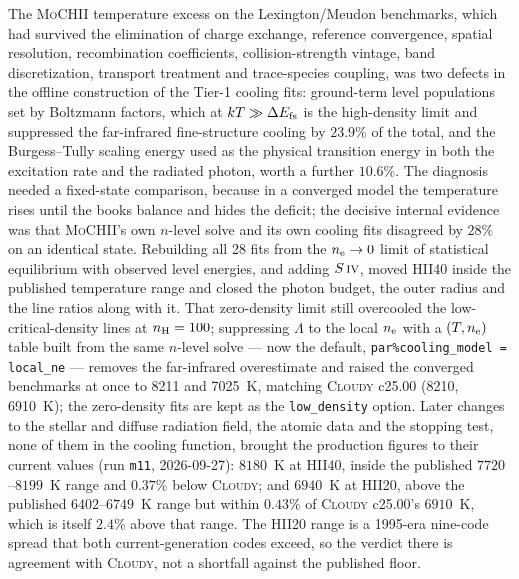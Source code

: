 \documentclass[english,a4paper]{my_memo}
\newcommand{\code}[1]{\texttt{#1}}
\newcommand{\MoCHII}{\textsc{MoCHII}}
\newcommand{\Cloudy}{\textsc{Cloudy}}
\newcommand{\SIV}{S\,\textsc{iv}}
\newcommand{\nel}{n_{\rm e}}
\newcommand{\nH}{n_{\rm H}}
\begin{document}
The \MoCHII{} temperature excess on the Lexington/Meudon benchmarks, which had
survived the elimination of charge exchange, reference convergence, spatial
resolution, recombination coefficients, collision-strength vintage, band
discretization, transport treatment and trace-species coupling, was two
defects in the offline construction of the Tier-1 cooling fits: ground-term
level populations set by Boltzmann factors, which at $kT \gg \Delta E_{\rm fs}$
is the high-density limit and suppressed the far-infrared fine-structure
cooling by $23.9\%$ of the total, and the Burgess--Tully scaling energy used
as the physical transition energy in both the excitation rate and the radiated
photon, worth a further $10.6\%$.  The diagnosis needed a fixed-state
comparison, because in a converged model the temperature rises until the books
balance and hides the deficit; the decisive internal evidence was that
\MoCHII{}'s own $n$-level solve and its own cooling fits disagreed by $28\%$
on an identical state.  Rebuilding all 28 fits from the $\nel \to 0$ limit of
statistical equilibrium with observed level energies, and adding $\SIV{}$,
moved HII40 inside the published temperature range and closed the photon
budget, the outer radius and the line ratios along with it.  That zero-density
limit still overcooled the low-critical-density lines at $\nH = 100$;
suppressing $\Lambda$ to the local $\nel$ with a $(T, \nel)$ table built from
the same $n$-level solve --- now the default,
\code{par\%cooling\_model = local\_ne} --- removes the far-infrared overestimate
and raised the converged benchmarks at once to 8211 and 7025~K, matching
\Cloudy{} c25.00 (8210, 6910~K); the zero-density fits are kept as the
\code{low\_density} option.  Later changes to the stellar and diffuse
radiation field, the atomic data and the stopping test, none of them in the
cooling function, brought the production figures to their current values (run
\code{m11}, 2026-09-27): $8180$~K at HII40, inside the published
$7720$--$8199$~K range and $0.37\%$ below \Cloudy{}; and $6940$~K at HII20,
above the published $6402$--$6749$~K range but within $0.43\%$ of \Cloudy{}
c25.00's $6910$~K, which is itself $2.4\%$ above that range.  The HII20 range is
a 1995-era nine-code spread that both current-generation codes exceed, so the
verdict there is agreement with \Cloudy{}, not a shortfall against the
published floor.
\end{document}

